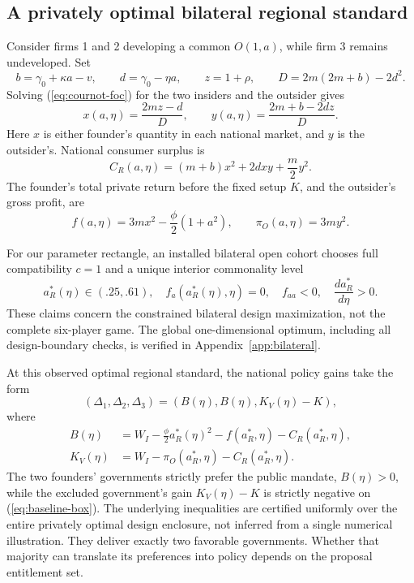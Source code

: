 \subsection{A privately optimal bilateral regional standard}\label{subsec:bilateral}

Consider firms 1 and 2 developing a common \(O(1,a)\), while firm 3 remains undeveloped. Set
\begin{equation}
 b=\gamma_0+\kappa a-v,\qquad d=\gamma_0-\eta a,
 \qquad z=1+\rho,\qquad
 D=2m(2m+b)-2d^2.
 \label{eq:bilateral-definitions}
\end{equation}
Solving (\ref{eq:cournot-foc}) for the two insiders and the outsider gives
\begin{equation}
 x(a,\eta)=\frac{2mz-d}{D},
 \qquad
 y(a,\eta)=\frac{2m+b-2dz}{D}.
 \label{eq:xy}
\end{equation}
Here \(x\) is either founder's quantity in each national market, and \(y\) is the outsider's. National consumer surplus is
\begin{equation}
 C_R(a,\eta)
 =(m+b)x^2+2dxy+\frac{m}{2}y^2.
 \label{eq:CR}
\end{equation}
The founder's total private return before the fixed setup \(K\), and the outsider's gross profit, are
\begin{equation}
 f(a,\eta)=3m x^2-\frac{\phi}{2}(1+a^2),
 \qquad
 \pi_O(a,\eta)=3m y^2.
 \label{eq:private-returns}
\end{equation}

For our parameter rectangle, an installed bilateral open cohort chooses full compatibility \(c=1\) and a unique interior commonality level
\begin{equation}
 a_R^*(\eta)\in(.25,.61),\quad
 f_a(a_R^*(\eta),\eta)=0,\quad
 f_{aa}<0,\quad \frac{da_R^*}{d\eta}>0.
 \label{eq:a-star}
\end{equation}
These claims concern the constrained bilateral design maximization, not the complete six-player game. The global one-dimensional optimum, including all design-boundary checks, is verified in Appendix~\ref{app:bilateral}.

At this observed optimal regional standard, the national policy gains take the form
\begin{equation}
 (\Delta_1,\Delta_2,\Delta_3)
 =\left(B(\eta),B(\eta),K_V(\eta)-K\right),
 \label{eq:bilateral-votes}
\end{equation}
where
\begin{align}
 B(\eta)
 &=W_I-\frac{\phi}{2}a_R^*(\eta)^2
       -f(a_R^*,\eta)-C_R(a_R^*,\eta),
       \label{eq:B}\\
 K_V(\eta)
 &=W_I-\pi_O(a_R^*,\eta)-C_R(a_R^*,\eta).
       \label{eq:KV}
\end{align}
The two founders' governments strictly prefer the public mandate, \(B(\eta)>0\), while the excluded government's gain \(K_V(\eta)-K\) is strictly negative on (\ref{eq:baseline-box}). The underlying inequalities are certified uniformly over the entire privately optimal design enclosure, not inferred from a single numerical illustration. They deliver exactly two favorable governments. Whether that majority can translate its preferences into policy depends on the proposal entitlement set.
